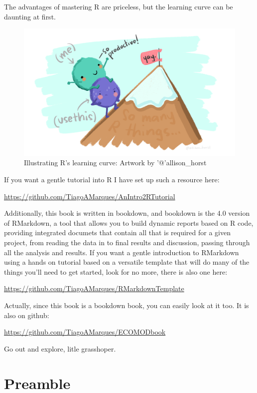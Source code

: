 \documentclass[
]{book}
\begin{document}
The advantages of mastering R are priceless, but the learning curve can be daunting at first.

\begin{figure}
\centering
\includegraphics{extfiles/usethis.png}
\caption{Illustrating R's learning curve: Artwork by '@'allison\_horst}
\end{figure}

If you want a gentle tutorial into R I have set up such a resource here:

\url{https://github.com/TiagoAMarques/AnIntro2RTutorial}

Additionally, this book is written in bookdown, and bookdown is the 4.0 version of RMarkdown, a tool that allows you to build dynamic reports based on R code, providing integrated documets that contain all that is required for a given project, from reading the data in to final results and discussion, passing through all the analysis and results. If you want a gentle introduction to RMarkdown using a hands on tutorial based on a versatile template that will do many of the things you'll need to get started, look for no more, there is also one here:

\url{https://github.com/TiagoAMarques/RMarkdownTemplate}

Actually, since this book is a bookdown book, you can easily look at it too. It is also on github:

\url{https://github.com/TiagoAMarques/ECOMODbook}

Go out and explore, litle grasshoper.

\hypertarget{mainintro}{%
\chapter{Preamble}\label{mainintro}}
\end{document}
